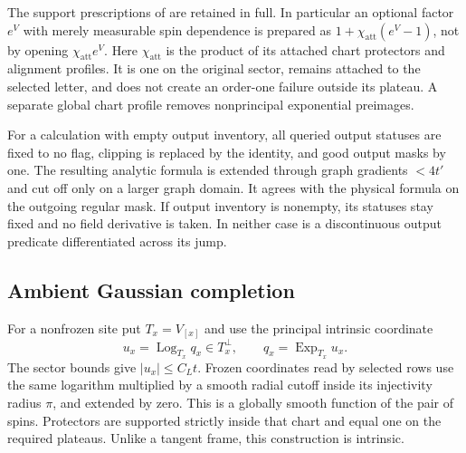 The support prescriptions of  are retained in
full.  In particular an optional factor $e^V$ with merely measurable
spin dependence is prepared as
$1+\chi_{\mathrm{att}}(e^V-1)$, not by opening
$\chi_{\mathrm{att}}e^V$.  Here $\chi_{\mathrm{att}}$ is the product
of its attached chart protectors and alignment profiles.  It is one
on the original sector, remains attached to the selected letter, and
does not create an order-one failure outside its plateau.  A separate
global chart profile removes nonprincipal exponential preimages.

For a calculation with empty output inventory, all queried output
statuses are fixed to no flag, clipping is replaced by the identity,
and good output masks by one.  The resulting analytic formula is
extended through graph gradients $<4t'$ and cut off only on a larger
graph domain.  It agrees with the physical formula on the outgoing
regular mask.  If output inventory is nonempty, its statuses stay
fixed and no field derivative is taken.  In neither case is a
discontinuous output predicate differentiated across its jump.

\subsection{Ambient Gaussian completion}
\label{subsec:rg-ambient}

For a nonfrozen site put $T_x=V_{[x]}$ and use the principal intrinsic
coordinate
\[
 u_x=\operatorname{Log}_{T_x}q_x\in T_x^\perp,
 \qquad q_x=\operatorname{Exp}_{T_x}u_x.
\]
The sector bounds give $|u_x|\le C_Lt$.  Frozen coordinates read by
selected rows use the same logarithm multiplied by a smooth radial
cutoff inside its injectivity radius $\pi$, and extended by zero.
This is a globally smooth function of the pair of spins.  Protectors
are supported strictly inside that chart and equal one on the
required plateaus.  Unlike a tangent frame, this construction is
intrinsic.

